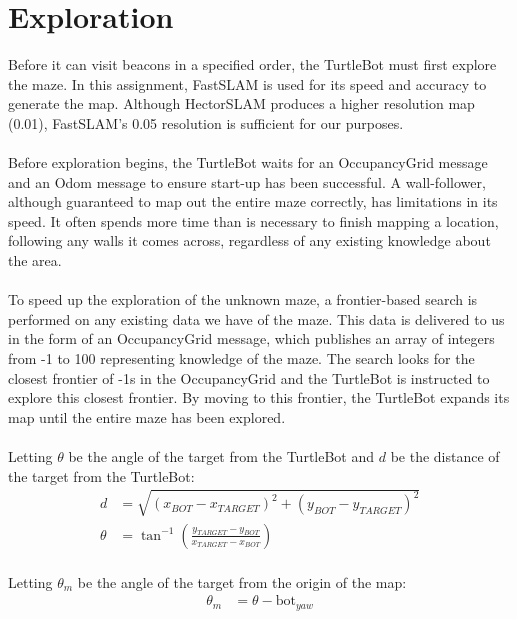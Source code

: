 \documentclass[titlepage,12pt,a4paper]{article}
\begin{document}
\pagebreak

\section*{Exploration}

Before it can visit beacons in a specified order, the TurtleBot must first explore the maze. In this assignment, FastSLAM is used for its speed and accuracy to generate the map. Although HectorSLAM produces a higher resolution map (0.01), FastSLAM's 0.05 resolution is sufficient for our purposes. \\
\\
Before exploration begins, the TurtleBot waits for an OccupancyGrid message and an Odom message to ensure start-up has been successful. A wall-follower, although guaranteed to map out the entire maze correctly, has limitations in its speed. It often spends more time than is necessary to finish mapping a location, following any walls it comes across, regardless of any existing knowledge about the area.\\
\\
To speed up the exploration of the unknown maze, a frontier-based search is performed on any existing data we have of the maze. This data is delivered to us in the form of an OccupancyGrid message, which publishes an array of integers from -1 to 100 representing knowledge of the maze. The search looks for the closest frontier of -1s in the OccupancyGrid and the TurtleBot is instructed to explore this closest frontier. By moving to this frontier, the TurtleBot expands its map until the entire maze has been explored. \\
\\
Letting $\theta$ be the angle of the target from the TurtleBot and $d$ be the distance of the target from the TurtleBot: \\

\begin{align*}
	d			&=	\sqrt{(x_{BOT} - x_{TARGET})^2 + (y_{BOT} - y_{TARGET})^2} \\
	\theta		&=	\tan^{-1}{(\frac{y_{TARGET} - y_{BOT}}{x_{TARGET} - x_{BOT}})} \\
\end{align*}

Letting $\theta_m$ be the angle of the target from the origin of the map:
\begin{align*}
		\theta_m 	&=	\theta - \text{bot}_{yaw} \\
\end{align*}
\end{document}

